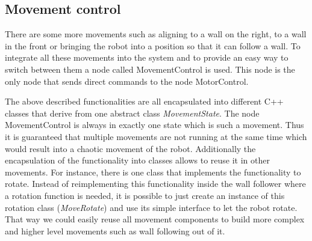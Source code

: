 \subsection{Movement control}
There are some more movements such as aligning to a wall on the right, to a wall in the front or bringing the robot into a position so that it can follow a wall. To integrate all these movements into the system and to provide an easy way to switch between them a node called MovementControl is used.
This node is the only node that sends direct commands to the node MotorControl.

 The above described functionalities are all encapsulated into different C++ classes that derive from one abstract class \textit{MovementState}. The node MovementControl is always in exactly one state which is such a movement. Thus it is guaranteed that multiple movements are not running at the same time which would result into a chaotic movement of the robot. Additionally the encapsulation of the functionality into classes allows to reuse it in other movements. For instance, there is one class that implements the functionality to rotate. Instead of reimplementing this functionality inside the wall follower where a rotation function is needed, it is possible to just create an instance of this rotation class (\textit{MoveRotate}) and use its simple interface to let the robot rotate. That way we could easily reuse all movement components to build more complex and higher level movements such as wall following out of it.   
